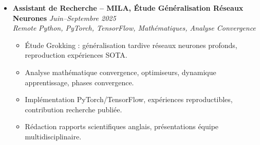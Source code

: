 \documentclass[a4paper,11pt]{article}
\begin{document}
\begin{itemize}[leftmargin=*, label={-}]
    \textit{Challenge D\'efense (ENSEA/Arm\'ee fran\c{c}aise)} \hfill \textit{C/C++, Nvidia Jetson, YOLOv10, SLAM, Linux}
    \vspace{-2pt}
        \begin{itemize}[leftmargin=0.4cm, nosep, label=\tiny$\bullet$]
            \item \small{Intégration Lidar 3D VLP16 + caméra profondeur, fusion capteurs SLAM temps r\'eel (architecture critique).}
            \item \small{Développement C/C++ sur Nvidia Jetson ARM, optimisation IA embarqu\'ee (YOLOv10 quantisé).}
            \item \small{Gestion mémoire optimisée, parallélisation GPU, pipeline traitement temps r\'eel robuste.}
            \item \small{Reproducibilité Docker, modélisation 3D (Onshape), test/validation complet syst\`eme.}
        \end{itemize}
    \vspace{3pt}
    \item \textbf{Assistant de Recherche -- MILA, \'Etude G\'en\'eralisation R\'eseaux Neurones} \hfill \textit{Juin--Septembre 2025} \\
    \textit{Remote} \hfill \textit{Python, PyTorch, TensorFlow, Mathématiques, Analyse Convergence}
    \vspace{-2pt}
        \begin{itemize}[leftmargin=0.4cm, nosep, label=\tiny$\bullet$]
            \item \small{\'Etude Grokking : généralisation tardive réseaux neurones profonds, reproduction expériences SOTA.}
            \item \small{Analyse mathématique convergence, optimiseurs, dynamique apprentissage, phases convergence.}
            \item \small{Implémentation PyTorch/TensorFlow, expériences reproductibles, contribution recherche publiée.}
            \item \small{Rédaction rapports scientifiques anglais, présentations équipe multidisciplinaire.}
        \end{itemize}
\end{itemize}
\end{document}
